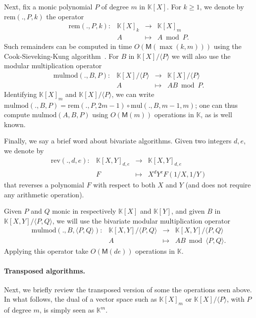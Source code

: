 \documentclass[12pt]{article}
\def\M {\ensuremath{\mathsf{M}}}
\def\K {\ensuremath{\mathbb{K}}}
\def\mul {\ensuremath{\mathrm{mul}}}
\def\rem {\ensuremath{\mathrm{rem}}}
\def\mulmod {\ensuremath{\mathrm{mulmod}}}
\def\rev {\ensuremath{\mathrm{rev}}}
\begin{document}
Next, fix a monic polynomial $P$ of degree $m$ in $\K[X]$. For $k \ge 1$, we denote by
$\rem(.,P,k)$ the operator
$$
\begin{array}{cccc}
\rem(.,P,k): &\K[X]_k& \to &\K[X]_{m}\\
& A & \mapsto & A \bmod P.
\end{array}$$ 
Such remainders can be computed in time $O(\M(\max(k,m)))$ using the
Cook-Sieveking-Kung algorithm~\cite[Chapter~9]{vzGG}. For $B$
in $\K[X]/\langle P \rangle$ we will also use the modular multiplication
operator
$$\begin{array}{cccc} \mulmod(.,B,P): & \K[X]/\langle P \rangle & \to
  & \K[X]/\langle P \rangle\\ & A & \mapsto & AB \bmod P.
\end{array}$$ 
Identifying $\K[X]_m$ and $\K[X]/\langle P \rangle$, we can write
$\mulmod(.,B,P) = \rem(.,P,2m-1) \circ \mul(.,B,m-1,m)$; one can thus
compute $\mulmod(A,B,P)$ using $O(\M(m))$ operations in $\K$, as is
well known.

Finally, we say a brief word about bivariate algorithms.  Given two
integers $d,e$, we denote by
$$
\begin{array}{cccc}
\rev(.,d,e): &\K[X,Y]_{d,e} &\to& \K[X,Y]_{d,e}  \\
& F & \mapsto & X^d Y^e F(1/X,1/Y)
\end{array}$$
that reverses a polynomial $F$ with respect to both $X$ and $Y$ (and
does not require any arithmetic operation).

Given $P$ and $Q$ monic in respectively $\K[X]$ and $\K[Y]$, 
and given $B$ in $\K[X,Y]/\langle P,Q\rangle$, we will use the
bivariate modular multiplication operator
$$\begin{array}{cccc} \mulmod(.,B,\langle P,Q \rangle): & \K[X,Y]/\langle P,Q \rangle & \to
  & \K[X,Y]/\langle P,Q \rangle\\ & A & \mapsto & AB \bmod \langle P, Q \rangle.
\end{array}$$ 
Applying this operator take $O(\M(de))$ operations in $\K$.


\paragraph{Transposed algorithms.}
Next, we briefly review the transposed version of some the operations
seen above. In what follows, the dual of a vector space such as
$\K[X]_m$ or $\K[X]/\langle P \rangle$, with $P$ of degree $m$, is
simply seen as $\K^m$.
\end{document}
